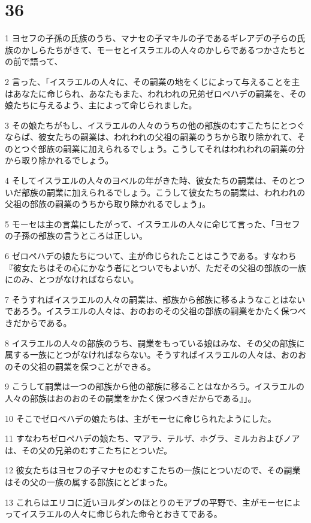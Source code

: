 \chapter{36}

\par 1 ヨセフの子孫の氏族のうち、マナセの子マキルの子であるギレアデの子らの氏族のかしらたちがきて、モーセとイスラエルの人々のかしらであるつかさたちとの前で語って、
\par 2 言った、「イスラエルの人々に、その嗣業の地をくじによって与えることを主はあなたに命じられ、あなたもまた、われわれの兄弟ゼロペハデの嗣業を、その娘たちに与えるよう、主によって命じられました。
\par 3 その娘たちがもし、イスラエルの人々のうちの他の部族のむすこたちにとつぐならば、彼女たちの嗣業は、われわれの父祖の嗣業のうちから取り除かれて、そのとつぐ部族の嗣業に加えられるでしょう。こうしてそれはわれわれの嗣業の分から取り除かれるでしょう。
\par 4 そしてイスラエルの人々のヨベルの年がきた時、彼女たちの嗣業は、そのとついだ部族の嗣業に加えられるでしょう。こうして彼女たちの嗣業は、われわれの父祖の部族の嗣業のうちから取り除かれるでしょう」。
\par 5 モーセは主の言葉にしたがって、イスラエルの人々に命じて言った、「ヨセフの子孫の部族の言うところは正しい。
\par 6 ゼロペハデの娘たちについて、主が命じられたことはこうである。すなわち『彼女たちはその心にかなう者にとついでもよいが、ただその父祖の部族の一族にのみ、とつがなければならない。
\par 7 そうすればイスラエルの人々の嗣業は、部族から部族に移るようなことはないであろう。イスラエルの人々は、おのおのその父祖の部族の嗣業をかたく保つべきだからである。
\par 8 イスラエルの人々の部族のうち、嗣業をもっている娘はみな、その父の部族に属する一族にとつがなければならない。そうすればイスラエルの人々は、おのおのその父祖の嗣業を保つことができる。
\par 9 こうして嗣業は一つの部族から他の部族に移ることはなかろう。イスラエルの人々の部族はおのおのその嗣業をかたく保つべきだからである』」。
\par 10 そこでゼロペハデの娘たちは、主がモーセに命じられたようにした。
\par 11 すなわちゼロペハデの娘たち、マアラ、テルザ、ホグラ、ミルカおよびノアは、その父の兄弟のむすこたちにとついだ。
\par 12 彼女たちはヨセフの子マナセのむすこたちの一族にとついだので、その嗣業はその父の一族の属する部族にとどまった。
\par 13 これらはエリコに近いヨルダンのほとりのモアブの平野で、主がモーセによってイスラエルの人々に命じられた命令とおきてである。


